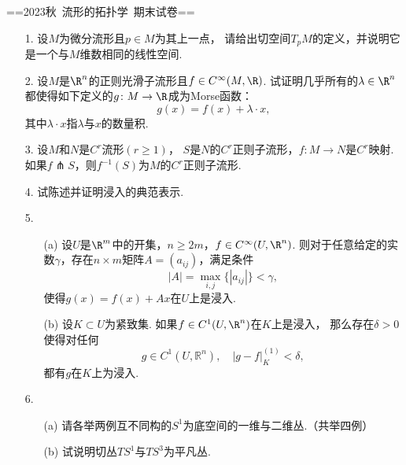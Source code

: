 ==2023秋\ 流形的拓扑学\ 期末试卷==

\begin{itemize}
\item[1.] 设$M$为微分流形且$p\in M$为其上一点，
请给出切空间$T_pM$的定义，并说明它是一个与$M$维数相同的线性空间.
\item[2.] 设$M$是$\R^n$的正则光滑子流形且$f\in C^\infty(M,\R)$. 
试证明几乎所有的$\lambda\in \R^n$都使得如下定义的$g\colon M\to \R$成为Morse函数：
$$g(x)=f(x)+\lambda\cdot x,$$
其中$\lambda\cdot x$指$\lambda$与$x$的数量积.
\item[3.] 设$M$和$N$是$C^r$流形$(r\geq 1)$，
$S$是$N$的$C^r$正则子流形，$f\colon M\to N$是$C^r$映射. 
如果$f\pitchfork S$，则$f^{-1}(S)$为$M$的$C^r$正则子流形.
\item[4.] 试陈述并证明浸入的典范表示.
\item[5.] 
\begin{itemize}
	\item [(a)] 设$U$是$\R^m$中的开集，$n\geq 2m$，$f\in C^\infty(U,\R^n)$. 
    则对于任意给定的实数$\gamma$，存在$n\times m$矩阵$A=(a_{ij})$，满足条件
	$$|A|=\max_{i,j}\{|a_{ij}|\}<\gamma,$$使得$g(x)=f(x)+Ax$在$U$上是浸入.
	\item [(b)] 设$K\subset U$为紧致集. 如果$f\in C^1(U,\R^n)$在$K$上是浸入，
    那么存在$\delta>0$使得对任何
	$$g\in C^1(U,\mathbb{R}^n), \quad |g-f|_K^{(1)}<\delta,$$
    都有$g$在$K$上为浸入.
\end{itemize}
\item[6.] 
\begin{itemize}
	\item [(a)] 请各举两例互不同构的$S^1$为底空间的一维与二维丛.（共举四例）
	\item [(b)] 试说明切丛$TS^1$与$TS^3$为平凡丛.
\end{itemize}
\end{itemize}


